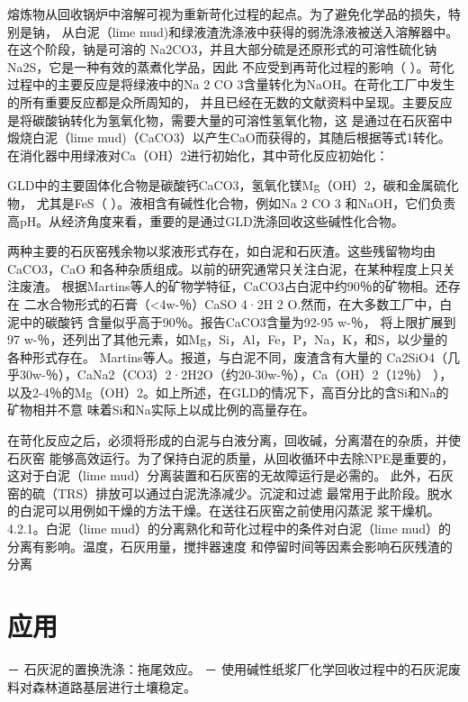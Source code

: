 \documentclass[11pt]{article}
\begin{document}
熔炼物从回收锅炉中溶解可视为重新苛化过程的起点。为了避免化学品的损失，特别是钠，
从白泥（lime mud)和绿液渣洗涤液中获得的弱洗涤液被送入溶解器中。在这个阶段，钠是可溶的
Na2CO3，并且大部分硫是还原形式的可溶性硫化钠Na2S，它是一种有效的蒸煮化学品，因此
不应受到再苛化过程的影响（\cite{Handbook_of_pulp} ）。苛化过程中的主要反应是将绿液中的Na 2 CO
3含量转化为NaOH。在苛化工厂中发生的所有重要反应都是众所周知的，
并且已经在无数的文献资料中呈现。主要反应是将碳酸钠转化为氢氧化物，需要大量的可溶性氢氧化物，这
是通过在石灰窑中煅烧白泥（lime mud)（CaCO3）以产生CaO而获得的，其随后根据等式1转化。
在消化器中用绿液对Ca（OH）2进行初始化，其中苛化反应初始化：

GLD中的主要固体化合物是碳酸钙CaCO3，氢氧化镁Mg（OH）2，碳和金属硫化物，
尤其是FeS（\cite{maekitalo14_charac_green_liquor_dregs_poten} ）。液相含有碱性化合物，例如Na 2 CO 3
和NaOH，它们负责高pH。从经济角度来看，重要的是通过GLD洗涤回收这些碱性化合物。\cite{Kinnarinen_2016}

两种主要的石灰窑残余物以浆液形式存在，如白泥和石灰渣。这些残留物均由CaCO3，CaO
和各种杂质组成。以前的研究通常只关注白泥，在某种程度上只关注废渣。
根据Martins等人的矿物学特征，CaCO3占白泥中约90％的矿物相。还存在
二水合物形式的石膏（<4w-％）CaSO 4·2H 2 O.然而，在大多数工厂中，白泥中的碳酸钙
含量似乎高于90％。报告CaCO3含量为92-95 w-％，
将上限扩展到97 w-％，还列出了其他元素，如Mg，Si，Al，Fe，P，Na，K，和S，以少量的
各种形式存在。 Martins等人。报道，与白泥不同，废渣含有大量的
Ca2SiO4（几乎30w-％），CaNa2（CO3）2·2H2O（约20-30w-％），Ca（OH）2（12％） ），
以及2-4％的Mg（OH）2。如上所述，在GLD的情况下，高百分比的含Si和Na的矿物相并不意
味着Si和Na实际上以成比例的高量存在。\cite{Kinnarinen_2016}

在苛化反应之后，必须将形成的白泥与白液分离，回收碱，分离潜在的杂质，并使石灰窑
能够高效运行。为了保持白泥的质量，从回收循环中去除NPE是重要的，这对于白泥（lime mud）分离装置和石灰窑的无故障运行是必需的。
此外，石灰窑的硫（TRS）排放可以通过白泥洗涤减少。沉淀和过滤
最常用于此阶段。脱水的白泥可以用例如干燥的方法干燥。在送往石灰窑之前使用闪蒸泥
浆干燥机。 4.2.1。白泥（lime mud）的分离熟化和苛化过程中的条件对白泥（lime mud）的分离有影响。温度，石灰用量，搅拌器速度
和停留时间等因素会影响石灰残渣的分离

\section{应用}
\label{sec:org032ba38}
－ \cite{eriksson96_displ_washin_lime_mud} 石灰泥的置换洗涤：拖尾效应。
－ \cite{.06_soil_stabil_fores_roads_sub} 使用碱性纸浆厂化学回收过程中的石灰泥废料对森林道路基层进行土壤稳定。
\end{document}
